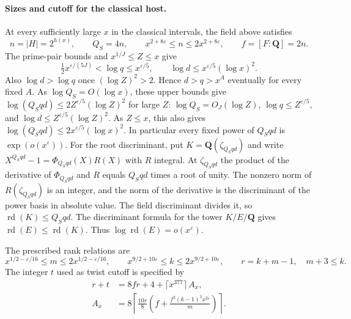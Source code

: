 \paragraph{Sizes and cutoff for the classical host.}
%
At every sufficiently large \(x\) in the classical intervals, the
field above satisfies
\begin{equation}
\label{eq:classical-host-scale}
 n=|H|=2^{h(x)},\qquad Q_S=4n,\qquad
 x^{2+8\varepsilon}\le n\le2x^{2+8\varepsilon},\qquad
 f=[F:\mathbf Q]=2n .
\end{equation}
The prime-pair bounds and \(x^{1/J}\le Z\le x\) give
\[
 \tfrac12 x^{\varepsilon/(5J)}<\log q\le x^{\varepsilon/5},
 \qquad
 \log d\le x^{\varepsilon/5}(\log x)^2 .
\]
Also \(\log d>\log q\) once \((\log Z)^2>2\). Hence \(d>q>x^A\)
eventually for every fixed \(A\).
As \(\log Q_S=O(\log x)\), these upper bounds give
\(\log(Q_Sqd)\le2Z^{\varepsilon/5}(\log Z)^2\) for large \(Z\):
\(\log Q_S=O_J(\log Z)\), \(\log q\le Z^{\varepsilon/5}\), and
\(\log d\le Z^{\varepsilon/5}(\log Z)^2\). As \(Z\le x\), this
also gives \(\log(Q_Sqd)\le2x^{\varepsilon/5}(\log x)^2\).
In particular every fixed power of \(Q_Sqd\) is
\(\exp(o(x^\varepsilon))\).
For the root discriminant, put \(K=\mathbf Q(\zeta_{Q_Sqd})\) and
write \(X^{Q_Sqd}-1=\Phi_{Q_Sqd}(X)R(X)\) with \(R\) integral.
At \(\zeta_{Q_Sqd}\) the product of the derivative of \(\Phi_{Q_Sqd}\)
and \(R\) equals \(Q_Sqd\) times a root of unity. The nonzero norm of
\(R(\zeta_{Q_Sqd})\) is an integer, and the norm of the derivative
is the discriminant of the power basis in absolute value.
The field discriminant divides it, so \(\operatorname{rd}(K)\le Q_Sqd\).
The discriminant formula for the tower \(K/E/\mathbf Q\) gives
\(\operatorname{rd}(E)\le\operatorname{rd}(K)\). Thus
\(\log\operatorname{rd}(E)=o(x^\varepsilon)\).

The prescribed rank relations are
\[
 x^{1/2-\varepsilon/16}\le m\le2x^{1/2-\varepsilon/16},\qquad
 x^{9/2+10\varepsilon}\le k\le2x^{9/2+10\varepsilon},\qquad
 r=k+m-1,\quad m+3\le k .
\]
The integer \(t\) used as twist cutoff is specified by
\begin{equation}
\label{eq:classical-rank-cutoff}
\begin{aligned}
 r+t &=8fr+4+\lceil x^{377}\rceil\,A_x,\\
 A_x &=8\left\lceil\frac{10r}{8}
     \left(f+\frac{f^2(k-1)^3x^{2\varepsilon}}{m}\right)\right\rceil .
\end{aligned}
\end{equation}

